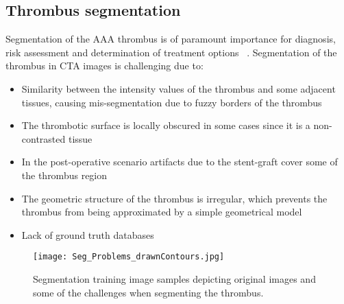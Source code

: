 \documentclass[preprint,authoryear,12pt]{elsarticle}
\begin{document}
\subsection{Thrombus segmentation}
Segmentation of the AAA thrombus is of paramount importance for diagnosis, risk assessment and determination of treatment options ~\citep{Mox10}. Segmentation of the thrombus in CTA images is challenging due to:
\begin{itemize}
\item Similarity between the intensity values of the thrombus and some adjacent tissues, causing mis-segmentation due to fuzzy borders of the thrombus
\item The thrombotic surface is locally obscured in some cases since it is a non-contrasted tissue
\item In the post-operative scenario artifacts due to the stent-graft cover some of the thrombus region
\item The geometric structure of the thrombus is irregular, which prevents the thrombus from being approximated by a simple geometrical model
\item Lack of ground truth databases
\end{itemize}

\begin{figure}[htb]
\centering
\texttt{[image: Seg\_Problems\_drawnContours.jpg]}
\caption{\label{fig:problems}Segmentation training image samples depicting original images and some of the challenges when segmenting the thrombus.}
\end{figure}
\end{document}
